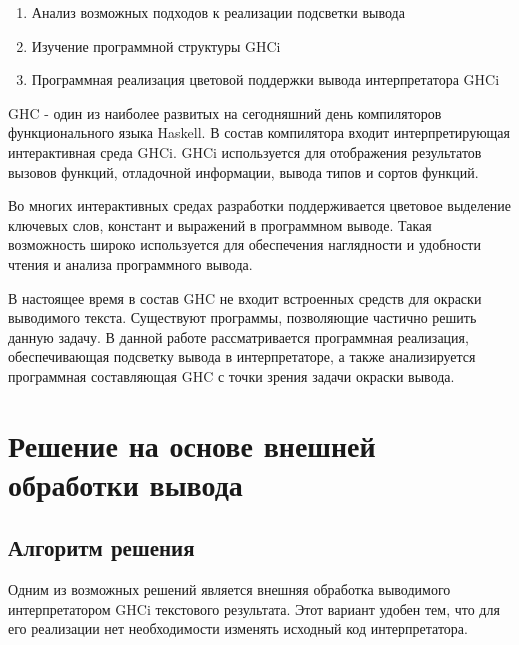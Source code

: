 







\begin{enumerate}
  \item Анализ возможных подходов к реализации подсветки вывода
  \item Изучение программной структуры GHCi
  \item Программная реализация цветовой поддержки вывода интерпретатора GHCi
\end{enumerate}  

\newpage
  
\tableofcontents

\newpage

\Intro

GHC - один из наиболее развитых на сегодняшний день компиляторов функционального языка Haskell. В состав компилятора входит интерпретирующая интерактивная среда GHCi. GHCi используется для отображения результатов вызовов функций, отладочной информации, вывода типов и сортов функций.

Во многих интерактивных средах разработки поддерживается цветовое выделение  ключевых слов, констант и выражений в программном выводе. Такая возможность широко используется для обеспечения наглядности и удобности чтения и анализа программного вывода.

В настоящее время в состав GHC не входит встроенных средств для окраски выводимого текста. Существуют программы, позволяющие частично решить данную задачу. В данной работе рассматривается программная реализация, обеспечивающая подсветку вывода в интерпретаторе, а также анализируется программная составляющая GHC с точки зрения задачи окраски вывода.

\section{Решение на основе внешней обработки вывода}
\subsection{Алгоритм решения}
Одним из возможных решений является внешняя обработка выводимого интерпретатором GHCi текстового результата. Этот вариант удобен тем, что для его реализации нет необходимости изменять исходный код интерпретатора.

